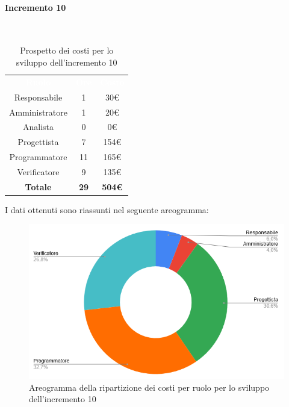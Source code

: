 \paragraph*{Incremento 10}\mbox{} \\
\begin{table}[H]
\centering\renewcommand{\arraystretch}{1.5}
\caption{Prospetto dei costi per lo sviluppo dell'incremento 10}
\vspace{0.2cm}
\begin{tabular}{ c c c }
\rowcolor{redafk}
\textcolor{white}{\textbf{Ruolo}} & \textcolor{white}{\textbf{Ore}} &
\textcolor{white}{\textbf{Costo}}  \\
Responsabile & 1 & 30€ \\
Amministratore & 1 & 20€ \\
Analista & 0 & 0€ \\
Progettista & 7 & 154€ \\
Programmatore & 11 & 165€  \\
Verificatore & 9 & 135€  \\
\rowcolor{lastrowcolor}
\textbf{Totale} & \textbf{29} & \textbf{504€}  \\
\end{tabular}
\end{table}
 
I dati ottenuti sono riassunti nel seguente areogramma:
\begin{figure}[H]
\centering
\includegraphics[scale=0.60]{img/grafici/torta_inc10.png}
\caption{Areogramma della ripartizione dei costi per ruolo per lo sviluppo dell'incremento 10}
\end{figure}

